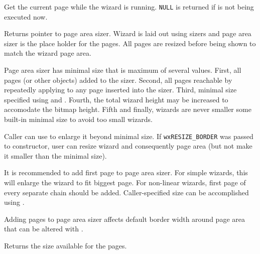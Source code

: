 \label{wxwizardgetcurrentpage}


Get the current page while the wizard is running. {\tt NULL} is returned if 
 is not being executed now.


\label{wxwizardgetpageareasizer}


Returns pointer to page area sizer. Wizard is laid out using sizers and
page area sizer is the place holder for the pages. All pages are resized before
being shown to match the wizard page area.

Page area sizer has minimal size that is maximum of several values. First,
all pages (or other objects) added to the sizer. Second, all pages reachable
by repeatedly applying 
 to
any page inserted into the sizer. Third,
minimal size specified using  and 
. Fourth, the total wizard height may
be increased to accomodate the bitmap height. Fifth and finally, wizards are
never smaller some built-in minimal size to avoid too small wizards.

Caller can use  to enlarge it
beyond minimal size. If {\tt wxRESIZE\_BORDER} was passed to constructor, user
can resize wizard and consequently page area (but not make it smaller than the
minimal size).

It is recommended to add first page to page area sizer. For simple wizards,
this will enlarge the wizard to fit biggest page. For non-linear wizards,
first page of every separate chain should be added. Caller-specified size
can be accomplished using .

Adding pages to page area sizer affects default border width around page
area that can be altered with .


\label{wxwizardgetpagesize}


Returns the size available for the pages.


\label{wxwizardhasnextpage}

